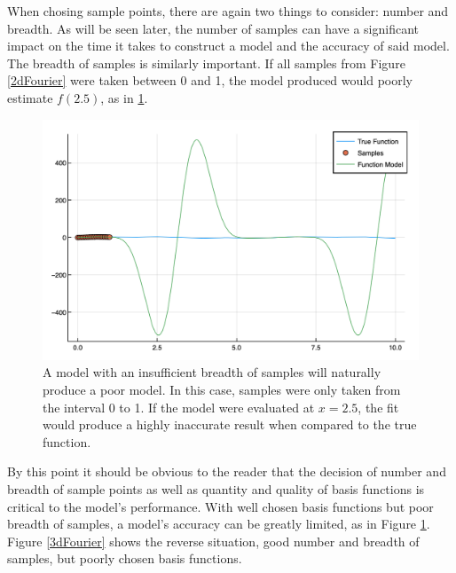 \par When chosing sample points, there are again two things to consider: number and breadth. As will be seen later, the number of samples can have a significant impact on the time it takes to construct a model and the accuracy of said model. The breadth of samples is similarly important. If all samples from Figure \ref{2dFourier} were taken between 0 and 1, the model produced would poorly estimate $f(2.5)$, as in \ref{poorSamps}. 

\begin{figure}[h]
\includegraphics[scale = 0.4]{Figures/poorSamps}
\caption{A model with an insufficient breadth of samples will naturally produce a poor model. In this case, samples were only taken from the interval 0 to 1. If the model were evaluated at $x=2.5$, the fit would produce a highly inaccurate result when compared to the true function.
\label{poorSamps}} 
\end{figure}

\par By this point it should be obvious to the reader that the decision of number and breadth of sample points as well as quantity and quality of basis functions is critical to the model's performance. With well chosen basis functions but poor breadth of samples, a model's accuracy can be greatly limited, as in Figure \ref{poorSamps}. Figure \ref{3dFourier} shows the reverse situation, good number and breadth of samples, but poorly chosen basis functions. 


